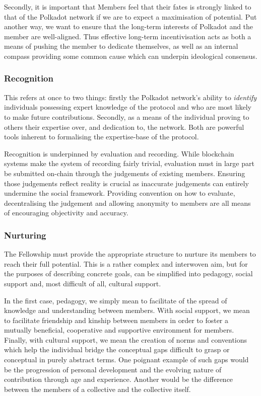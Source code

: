 \documentclass[9pt,oneside]{amsart}
\begin{document}
Secondly, it is important that Members feel that their fates is strongly linked to that of the Polkadot network if we are to expect a maximisation of potential. Put another way, we want to ensure that the long-term interests of Polkadot and the member are well-aligned. Thus effective long-term incentivisation acts as both a means of pushing the member to dedicate themselves, as well as an internal compass providing some common cause which can underpin ideological consensus.

\subsubsection{Recognition}

This refers at once to two things: firstly the Polkadot network's ability to \emph{identify} individuals possessing expert knowledge of the protocol and who are most likely to make future contributions. Secondly, as a means of the individual proving to others their expertise over, and dedication to, the network. Both are powerful tools inherent to formalising the expertise-base of the protocol.

Recognition is underpinned by evaluation and recording. While blockchain systems make the system of recording fairly trivial, evaluation must in large part be submitted on-chain through the judgements of existing members. Ensuring those judgements reflect reality is crucial as inaccurate judgements can entirely undermine the social framework. Providing convention on how to evaluate, decentralising the judgement and allowing anonymity to members are all means of encouraging objectivity and accuracy.

\subsubsection{Nurturing}

The Fellowship must provide the appropriate structure to nurture its members to reach their full potential. This is a rather complex and interwoven aim, but for the purposes of describing concrete goals, can be simplified into pedagogy, social support and, most difficult of all, cultural support.

In the first case, pedagogy, we simply mean to facilitate of the spread of knowledge and understanding between members. With social support, we mean to facilitate friendship and kinship between members in order to foster a mutually beneficial, cooperative and supportive environment for members. Finally, with cultural support, we mean the creation of norms and conventions which help the individual bridge the conceptual gaps difficult to grasp or conceptual in purely abstract terms. One poignant example of such gaps would be the progression of personal development and the evolving nature of contribution through age and experience. Another would be the difference between the members of a collective and the collective itself.
\end{document}
